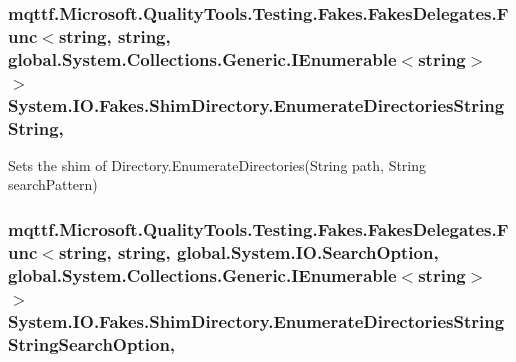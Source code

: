 \hypertarget{class_system_1_1_i_o_1_1_fakes_1_1_shim_directory_a7c447cfb39617189122f645ad8d175ce}{
\subsubsection[{Enumerate\-Directories\-String\-String}]{\setlength{\rightskip}{0pt plus 5cm}mqttf.\-Microsoft.\-Quality\-Tools.\-Testing.\-Fakes.\-Fakes\-Delegates.\-Func$<$string, string, global.\-System.\-Collections.\-Generic.\-I\-Enumerable$<$string$>$ $>$ System.\-I\-O.\-Fakes.\-Shim\-Directory.\-Enumerate\-Directories\-String\-String\hspace{0.3cm}{\ttfamily [static]}, {\ttfamily [set]}}}\label{class_system_1_1_i_o_1_1_fakes_1_1_shim_directory_a7c447cfb39617189122f645ad8d175ce}


Sets the shim of Directory.\-Enumerate\-Directories(\-String path, String search\-Pattern)

\hypertarget{class_system_1_1_i_o_1_1_fakes_1_1_shim_directory_a72a18f13f116637161293f9d8dad4961}{
\subsubsection[{Enumerate\-Directories\-String\-String\-Search\-Option}]{\setlength{\rightskip}{0pt plus 5cm}mqttf.\-Microsoft.\-Quality\-Tools.\-Testing.\-Fakes.\-Fakes\-Delegates.\-Func$<$string, string, global.\-System.\-I\-O.\-Search\-Option, global.\-System.\-Collections.\-Generic.\-I\-Enumerable$<$string$>$ $>$ System.\-I\-O.\-Fakes.\-Shim\-Directory.\-Enumerate\-Directories\-String\-String\-Search\-Option\hspace{0.3cm}{\ttfamily [static]}, {\ttfamily [set]}}}\label{class_system_1_1_i_o_1_1_fakes_1_1_shim_directory_a72a18f13f116637161293f9d8dad4961}


